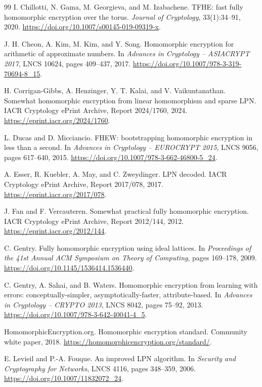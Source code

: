 \begin{thebibliography}{99}
I. Chillotti, N. Gama, M. Georgieva, and M. Izabachene.
TFHE: fast fully homomorphic encryption over the torus.
\emph{Journal of Cryptology}, 33(1):34--91, 2020.
\url{https://doi.org/10.1007/s00145-019-09319-x}.

J. H. Cheon, A. Kim, M. Kim, and Y. Song.
Homomorphic encryption for arithmetic of approximate numbers.
In \emph{Advances in Cryptology -- ASIACRYPT 2017}, LNCS 10624, pages 409--437, 2017.
\url{https://doi.org/10.1007/978-3-319-70694-8_15}.

H. Corrigan-Gibbs, A. Henzinger, Y. T. Kalai, and V. Vaikuntanathan.
Somewhat homomorphic encryption from linear homomorphism and sparse LPN.
IACR Cryptology ePrint Archive, Report 2024/1760, 2024.
\url{https://eprint.iacr.org/2024/1760}.

L. Ducas and D. Micciancio.
FHEW: bootstrapping homomorphic encryption in less than a second.
In \emph{Advances in Cryptology -- EUROCRYPT 2015}, LNCS 9056, pages 617--640, 2015.
\url{https://doi.org/10.1007/978-3-662-46800-5_24}.

A. Esser, R. Kuebler, A. May, and C. Zweydinger.
LPN decoded.
IACR Cryptology ePrint Archive, Report 2017/078, 2017.
\url{https://eprint.iacr.org/2017/078}.

J. Fan and F. Vercauteren.
Somewhat practical fully homomorphic encryption.
IACR Cryptology ePrint Archive, Report 2012/144, 2012.
\url{https://eprint.iacr.org/2012/144}.

C. Gentry.
Fully homomorphic encryption using ideal lattices.
In \emph{Proceedings of the 41st Annual ACM Symposium on Theory of Computing}, pages 169--178, 2009.
\url{https://doi.org/10.1145/1536414.1536440}.

C. Gentry, A. Sahai, and B. Waters.
Homomorphic encryption from learning with errors: conceptually-simpler, asymptotically-faster, attribute-based.
In \emph{Advances in Cryptology -- CRYPTO 2013}, LNCS 8042, pages 75--92, 2013.
\url{https://doi.org/10.1007/978-3-642-40041-4_5}.

HomomorphicEncryption.org.
Homomorphic encryption standard.
Community white paper, 2018.
\url{https://homomorphicencryption.org/standard/}.

E. Levieil and P.-A. Fouque.
An improved LPN algorithm.
In \emph{Security and Cryptography for Networks}, LNCS 4116, pages 348--359, 2006.
\url{https://doi.org/10.1007/11832072_24}.


\end{thebibliography}
